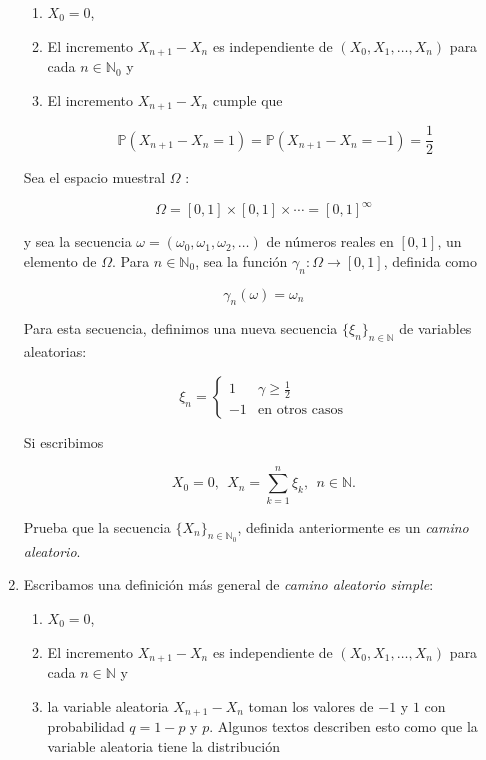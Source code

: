 \documentclass[a4paper,11pt]{report}
\newcommand{\PR}{\mathbb{P}}
\begin{document}
\begin{enumerate}
\begin{enumerate}
	\item $X_0 = 0$,
	\item El incremento $X_{n + 1} - X_n$ es independiente de $(X_0, X_1, \dots, X_n)$ para cada $n \in \mathbb{N}_{0}$ y 
	\item  El incremento $X_{n + 1} - X_n$ cumple que
	
	\[
	\PR(X_{n + 1} - X_n = 1) = \PR(X_{n + 1} - X_n = -1) = \frac{1}{2}
	\]
\end{enumerate}

Sea el espacio muestral $\Omega$ :

\[
\Omega = [0, 1] \times [0,1]\times \cdots = [0, 1]^{\infty}
\]

y sea la secuencia  $\omega = (\omega_{0}, \omega_{1}, \omega_{2}, \dots)$ de n\'umeros reales en $[0,1]$, un elemento de $\Omega$. Para $n \in \mathbb{N}_{0}$, sea la funci\'on $\gamma_n: \Omega \rightarrow [0,1]$, definida como

\[
\gamma_{n}(\omega) = \omega_{n}
\]

Para esta secuencia, definimos una nueva secuencia $\{ \xi_{n}\}_{n \in \mathbb{N}} $ de variables aleatorias:

\[
\xi_{n} = \begin{cases}
1 & \gamma \geq \frac{1}{2}\\
-1 & \text{en otros casos}
\end{cases}
\]

Si escribimos 

\[
X_0 = 0, \ \ X_n = \sum_{k = 1}^{n}\xi_{k}, \ \ n\in \mathbb{N}.
\]

\vspace{0.2cm}

Prueba que la secuencia $\{ X_n\}_{n \in \mathbb{N}_{0}}$, definida anteriormente es un \textit{camino aleatorio}.

\item Escribamos una definici\'on m\'as general de \textit{camino aleatorio simple}:

\begin{enumerate}
	\item $X_0 = 0$,
	\item El incremento $X_{n + 1} - X_n$ es independiente de $(X_0, X_1, \dots, X_n)$ para cada $n \in \mathbb{N}$ y 
	\item   la variable aleatoria  $X_{n + 1} - X_n$ toman los valores de $-1$ y $1$ con probabilidad $q = 1 -p $ y $p$. Algunos textos describen esto como que la variable aleatoria tiene la distribuci\'on
	

\end{enumerate}
\end{enumerate}
\end{document}
